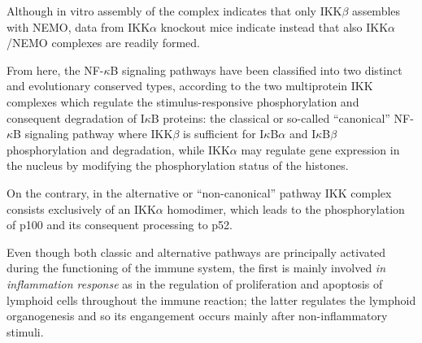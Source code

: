 \documentclass[12pt,a4paper]{report}
\begin{document}
Although in vitro assembly of the complex indicates that only IKK$\beta$ assembles with NEMO, data from IKK$\alpha$ knockout mice indicate instead that also IKK$\alpha$/NEMO
complexes are readily formed.

From here, the NF-$\kappa$B signaling pathways have been classified into two distinct and evolutionary
conserved types, according to the two multiprotein IKK complexes which regulate the stimulus-responsive phosphorylation and consequent degradation of I$\kappa$B proteins: the classical or so-called “canonical” NF-$\kappa$B signaling pathway where IKK$\beta$ is sufficient for I$\kappa$B$\alpha$ and
I$\kappa$B$\beta$ phosphorylation and degradation, while IKK$\alpha$ may regulate gene expression in the
nucleus by modifying the phosphorylation status of the histones.

On the contrary, in the
alternative or “non-canonical” pathway IKK complex consists exclusively of an IKK$\alpha$ homodimer, which leads to the phosphorylation of p100 and its consequent processing to p52.

Even though both classic and alternative pathways are principally activated during the functioning of the immune system, the first is mainly involved \emph{in inflammation response} as in the regulation of proliferation and apoptosis of lymphoid cells throughout the
immune reaction; the latter regulates the lymphoid organogenesis and so its engangement occurs mainly after non-inflammatory stimuli.





  
\end{document}
